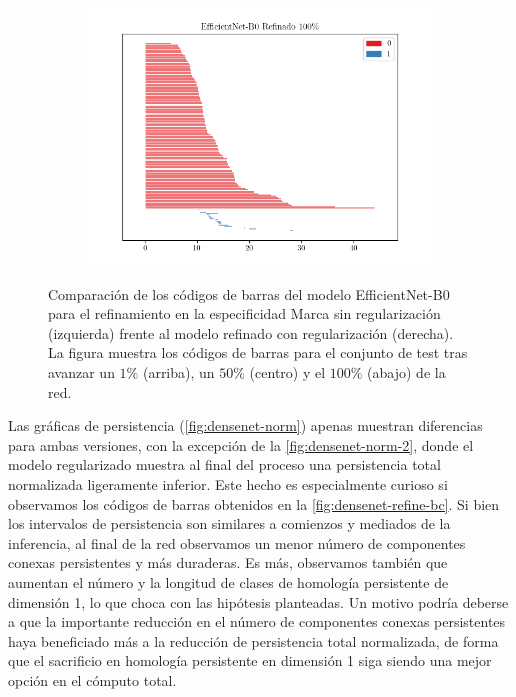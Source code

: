 \begin{figure}[H]
\begin{subfigure}
	\end{subfigure}%
	\begin{subfigure}
		{.5\textwidth}
		\centering
		\includegraphics[width=\linewidth]{img/bar_effcientnet_refine_1.00.png}
	\end{subfigure}
	
	\caption{Comparación de los códigos de barras del modelo EfficientNet-B0 para
		el refinamiento en la especificidad Marca sin regularización (izquierda)
		frente al modelo refinado con regularización (derecha). La figura muestra los códigos
		de barras para el conjunto de test tras avanzar un $1\%$ (arriba), un $50\%$ (centro)
		y el $100\%$ (abajo) de la red.}
	\label{fig:efficientnet-refine-bc}
\end{figure}

Las gráficas de persistencia (\autoref{fig:densenet-norm}) apenas muestran diferencias
para ambas versiones, con la excepción de la \autoref{fig:densenet-norm-2}, donde
el modelo regularizado muestra al final del proceso una persistencia total normalizada
ligeramente inferior. Este hecho es especialmente curioso si observamos los
códigos de barras obtenidos en la \autoref{fig:densenet-refine-bc}. Si bien los intervalos
de persistencia son similares a comienzos y mediados de la inferencia, al final
de la red observamos un menor número de componentes conexas persistentes y más
duraderas. Es más, observamos también que aumentan el número y la longitud de
clases de homología persistente de dimensión 1, lo que choca con las hipótesis planteadas.
Un motivo podría deberse a que la importante reducción en el número de
componentes conexas persistentes haya beneficiado más a la reducción de
persistencia total normalizada, de forma que el sacrificio en homología persistente
en dimensión 1 siga siendo una mejor opción en el cómputo total.

